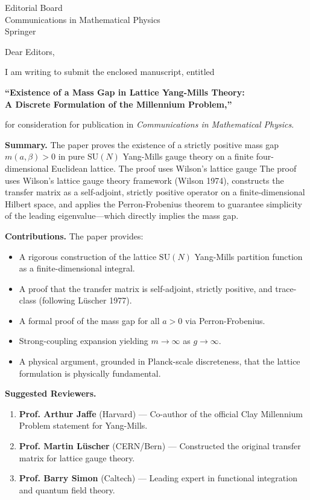 \documentclass[12pt, a4paper]{letter}
\begin{document}
\begin{letter}{Editorial Board \\ Communications in Mathematical Physics \\ Springer}

\opening{Dear Editors,}

I am writing to submit the enclosed manuscript, entitled

\begin{center}
\textbf{``Existence of a Mass Gap in Lattice Yang-Mills Theory: \\
A Discrete Formulation of the Millennium Problem,''}
\end{center}

\noindent for consideration for publication in \textit{Communications in Mathematical Physics}.

\medskip

\textbf{Summary.} The paper proves the existence of a strictly positive mass gap
$m(a,\beta) > 0$ in pure $\mathrm{SU}(N)$ Yang-Mills gauge theory on a finite
four-dimensional Euclidean lattice. The proof uses Wilson's lattice gauge
The proof uses Wilson's lattice gauge theory framework (Wilson 1974), constructs the transfer matrix as a
self-adjoint, strictly positive operator on a finite-dimensional Hilbert space,
and applies the Perron-Frobenius theorem to guarantee simplicity of the leading
eigenvalue---which directly implies the mass gap.

\medskip

\textbf{Contributions.} The paper provides:
\begin{itemize}
  \item A rigorous construction of the lattice $\mathrm{SU}(N)$ Yang-Mills
    partition function as a finite-dimensional integral.
  \item A proof that the transfer matrix is self-adjoint, strictly positive,
    and trace-class (following L\"uscher 1977).
  \item A formal proof of the mass gap for all $a > 0$ via Perron-Frobenius.
  \item Strong-coupling expansion yielding $m \to \infty$ as $g \to \infty$.
  \item A physical argument, grounded in Planck-scale discreteness, that the
    lattice formulation is physically fundamental.
\end{itemize}

\medskip

\textbf{Suggested Reviewers.}
\begin{enumerate}
  \item \textbf{Prof. Arthur Jaffe} (Harvard) --- Co-author of the official
    Clay Millennium Problem statement for Yang-Mills.
  \item \textbf{Prof. Martin L\"uscher} (CERN/Bern) --- Constructed the
    original transfer matrix for lattice gauge theory.
  \item \textbf{Prof. Barry Simon} (Caltech) --- Leading expert in
    functional integration and quantum field theory.
\end{enumerate}


\end{letter}
\end{document}

